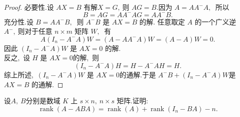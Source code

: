\begin{proof}
	必要性.设 $ A X=B $ 有解$  X=G ,\  $则  $A G=B .$因为 $ A=A A^{-} A ,\ $ 所以
	$$B=A G=A A^{-} A G=A A^{-} B .$$
	充分性.设  $B=A A^{-} B ,\ $ 则  $A^{-} B $ 是 $ A X=B $ 的解.
	任意取定  $A $ 的一个广义逆 $ A^{-} ,\  $则对于任意  $n \times m $ 矩阵  $W ,\ $ 有
	$$A\left(I_{n}-A^{-} A\right) W=\left(A-A A^{-} A\right) W=(A-A) W=0 .$$
	因此  $\left(I_{n}-A^{-} A\right) W $ 是 $ A X=0 $ 的解.\\
	反之,\  设  $H $ 是 $ A X=0  $的解,\  则
	$$\left(I_{n}-A^{-} A\right) H=H-A^{-} A H=H.$$
	综上所述,\  $ \left(I_{n}-A^{-} A\right) W $ 是 $ A X=0  $的通解.于是  $A^{-} B+\left(I_{n}-A^{-} A\right) W  $是  $A X=B $ 的通解.
\end{proof}
\newpage
\begin{problem}
	设$  A ,\ B  $分别是数域  $K $ 上 $ s \times n ,\  n \times s $ 矩阵.证明:
	$$\operatorname{rank}(A-A B A)=\operatorname{rank}(A)+\operatorname{rank}\left(I_{n}-B A\right)-n .$$
\end{problem}
